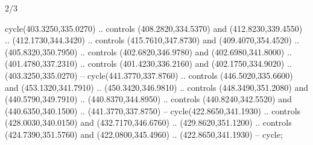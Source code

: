 \begin{flagdescription}{2/3}
\begin{scope}[xshift=0.5\flaglength]
\begin{scope}[scale=0.0021\flagwidth,yshift=167.8mm,xshift=-125.3mm]
\begin{scope}[y=-0.8pt, x=0.8pt, inner sep=0pt, outer sep=0pt]
  cycle(403.3250,335.0270) .. controls (408.2820,334.5370) and
  (412.8230,339.4550) .. (412.1730,344.3420) .. controls (415.7610,347.8730) and
  (409.4070,354.4520) .. (405.8320,350.7950) .. controls (402.6820,346.9780) and
  (402.6980,341.8000) .. (401.4780,337.2310) .. controls (401.4230,336.2160) and
  (402.1750,334.9020) .. (403.3250,335.0270) -- cycle(441.3770,337.8760) ..
  controls (446.5020,335.6600) and (453.1320,341.7910) .. (450.3420,346.9810) ..
  controls (448.3490,351.2080) and (440.5790,349.7910) .. (440.8370,344.8950) ..
  controls (440.8240,342.5520) and (440.6350,340.1500) .. (441.3770,337.8750) --
  cycle(422.8650,341.1930) .. controls (428.0030,340.0150) and
  (432.7170,346.6760) .. (429.8620,351.1200) .. controls (424.7390,351.5760) and
  (422.0800,345.4960) .. (422.8650,341.1930) -- cycle;
\end{scope}
\end{scope}
\end{scope}
\fi
\framecode{}
\end{flagdescription}
